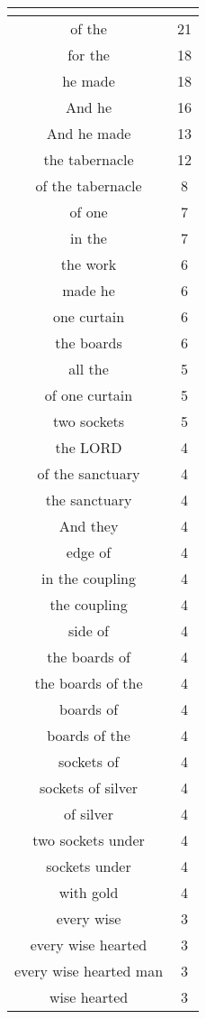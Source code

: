 \begin{center}
\begin{longtable}{|c|c|}
\hline \multicolumn{2}{c}{{ }} \\ \hline
\endfoot 
of the & 21\\ \hline 
for the & 18\\ \hline 
he made & 18\\ \hline 
And he & 16\\ \hline 
And he made & 13\\ \hline 
the tabernacle & 12\\ \hline 
of the tabernacle & 8\\ \hline 
of one & 7\\ \hline 
in the & 7\\ \hline 
the work & 6\\ \hline 
made he & 6\\ \hline 
one curtain & 6\\ \hline 
the boards & 6\\ \hline 
all the & 5\\ \hline 
of one curtain & 5\\ \hline 
two sockets & 5\\ \hline 
the LORD & 4\\ \hline 
of the sanctuary & 4\\ \hline 
the sanctuary & 4\\ \hline 
And they & 4\\ \hline 
edge of & 4\\ \hline 
in the coupling & 4\\ \hline 
the coupling & 4\\ \hline 
side of & 4\\ \hline 
the boards of & 4\\ \hline 
the boards of the & 4\\ \hline 
boards of & 4\\ \hline 
boards of the & 4\\ \hline 
sockets of & 4\\ \hline 
sockets of silver & 4\\ \hline 
of silver & 4\\ \hline 
two sockets under & 4\\ \hline 
sockets under & 4\\ \hline 
with gold & 4\\ \hline 
every wise & 3\\ \hline 
every wise hearted & 3\\ \hline 
every wise hearted man & 3\\ \hline 
wise hearted & 3\\ \hline 

\end{longtable}
\end{center}

